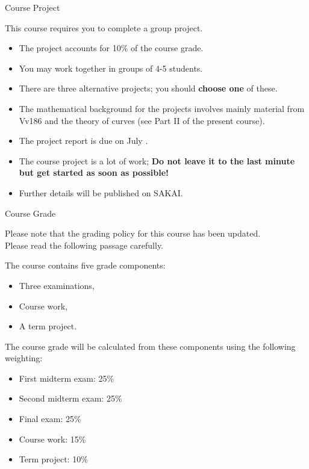 \documentclass[smaller,hyperref={CJKbookmarks=true}]{beamer}
\begin{document}
\begin{frame}{Course Project}
\begin{spacing}{1.15}
This course requires you to complete a group project.
\begin{itemize}
  \item The project accounts for 10\% of the course grade.
  \item You may work together in groups of 4-5 students.
  \item There are three alternative projects; you should \textbf{choose one} of these.
  \item The mathematical background for the projects involves mainly
material from Vv186 and the theory of curves (see Part II of the
present course).
  \item The project report is due on July .
  \item The course project is a lot of work; \textcolor[rgb]{1.00,0.00,0.00}{\textbf{Do not leave it to the last
minute but get started as soon as possible!}}
  \item Further details will be published on SAKAI.
\end{itemize}
\end{spacing}
\end{frame}
\begin{frame}[t]{Course Grade}\begin{spacing}{1}
Please note that the grading policy for this course has been updated. \\
Please read the following passage carefully.\end{spacing}\vspace*{10pt} The course contains five grade components:
\begin{itemize}
  \item Three examinations,
  \item Course work,
  \item A term project.
\end{itemize}
The course grade will be calculated from these components using the
following weighting:
\begin{itemize}
  \item First midterm exam: 25\%
  \item Second midterm exam: 25\%
  \item Final exam: 25\%
  \item Course work: 15\%
  \item Term project: 10\%
\end{itemize}
\end{frame}
\end{document}
